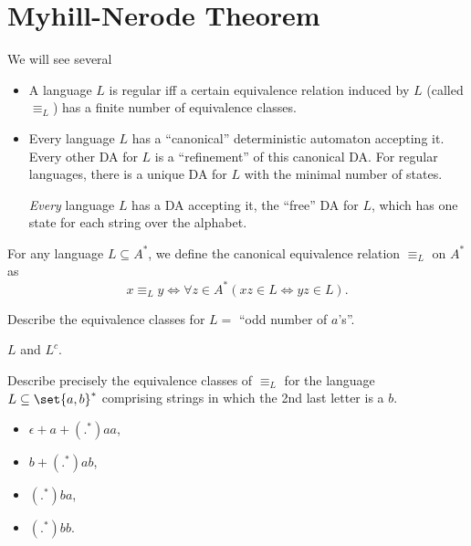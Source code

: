 \section{Myhill-Nerode Theorem} \label{sec:mn}
We will see several %
\begin{itemize}
    \item A language $L$ is regular iff a certain equivalence relation
    induced by $L$ (called $\equiv_L$) has a finite number of equivalence
    classes.
    \item Every language $L$ has a ``canonical'' deterministic automaton
    accepting it.
    Every other DA for $L$ is a ``refinement'' of this canonical DA.
    For regular languages, there is a unique DA for $L$ with the minimal
    number of states.
    \begin{remark}
        \emph{Every} language $L$ has a DA accepting it, the ``free'' DA for
        $L$, which has one state for each string over the alphabet.
    \end{remark}
\end{itemize}


\begin{definition*}
    For any language $L \subseteq A^*$, we define the canonical equivalence
    relation $\equiv_L$ on $A^*$ as \[
        x \equiv_L y \iff \forall z \in A^*(xz \in L \iff yz \in L).
    \]
\end{definition*}

\begin{exercise}
    Describe the equivalence classes for $L = $ ``odd number of $a$'s''.
\end{exercise}
\begin{solution}
    $L$ and $L^c$.
\end{solution}

\begin{exercise}
    Describe precisely the equivalence classes of $\equiv_L$ for the
    language $L \subseteq \set{a, b}^*$ comprising strings in which the 2nd
    last letter is a $b$.
\end{exercise}
\begin{solution} \leavevmode
    \begin{itemize}
        \item $\epsilon + a + (.^*)aa$,
        \item $b + (.^*)ab$,
        \item $(.^*)ba$,
        \item $(.^*)bb$.
    \end{itemize}
\end{solution}

